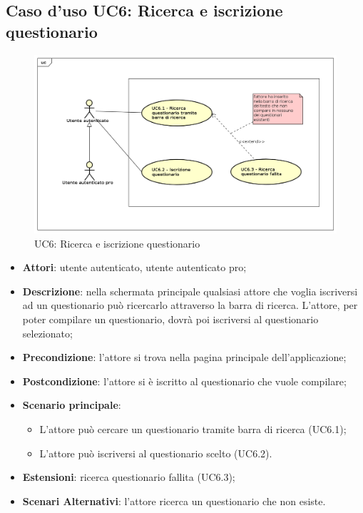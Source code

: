\newpage
\subsection{Caso d'uso UC6: Ricerca e iscrizione questionario}
\label{UC6}
\begin{figure}[h]
\centering
\includegraphics[scale=0.5,keepaspectratio]{UML/UC6.png}
\caption{UC6: Ricerca e iscrizione questionario}
\end{figure}
\FloatBarrier
\begin{itemize}
\item\textbf{Attori}: utente autenticato, utente autenticato pro;
\item\textbf{Descrizione}: nella schermata principale qualsiasi attore che voglia iscriversi ad un questionario può ricercarlo attraverso la barra di ricerca. L'attore, per poter compilare un questionario, dovrà poi iscriversi al questionario selezionato;	
\item\textbf{Precondizione}: l'attore si trova nella pagina principale dell'applicazione;
\item\textbf{Postcondizione}: l'attore si è iscritto al questionario che vuole compilare;
\item\textbf{Scenario principale}:
\begin{itemize}
\item L'attore può cercare un questionario tramite barra di ricerca (UC6.1);
\item L'attore può iscriversi al questionario scelto (UC6.2).
\end{itemize}
\item\textbf{Estensioni}: ricerca questionario fallita (UC6.3);
\item\textbf{Scenari Alternativi}: l'attore ricerca un questionario che non esiste. 
\end{itemize}

